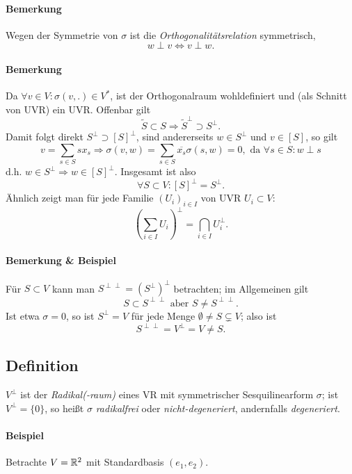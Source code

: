 \paragraph{Bemerkung}
	Wegen der Symmetrie von $ \sigma $ ist die \emph{Orthogonalitätsrelation} symmetrisch,
		\[ w \perp v \Leftrightarrow v \perp w. \]
\paragraph{Bemerkung}
	Da $ \forall v\in V: \sigma(v,.) \in V^* $, ist der Orthogonalraum wohldefiniert und (als Schnitt von UVR) ein UVR. Offenbar gilt
		\[ \tilde{S} \subset S \Rightarrow \tilde{S}^\perp \supset S^\perp. \]
	Damit folgt direkt $ S^\perp \supset [S]^\perp $, sind andererseits $ w\in S^\perp $ und $ v\in [S] $, so gilt
		\[ v = \sum_{s\in S}sx_s \Rightarrow \sigma(v,w)= \sum_{s\in S}\overline{x_s}\sigma(s,w) = 0, \text{ da } \forall s\in S: w\perp s \]
	d.h. $ w\in S^\perp \Rightarrow w\in [S]^\perp. $ Insgesamt ist also
		\[ \forall S \subset V: [S]^\perp=S^\perp.\]
	Ähnlich zeigt man für jede Familie $ (U_i)_{i\in I} $ von UVR $ U_i\subset V $:
		\[ \left(\sum_{i\in I}U_i \right)^\perp= \bigcap_{i\in I} U_i^\perp. \]
\paragraph{Bemerkung \& Beispiel}
	Für $ S\subset V $ kann man $ S^{\perp\perp} = \left(S^\perp\right)^\perp $ betrachten; im Allgemeinen gilt
		\[ S\subset S^{\perp\perp} \text{ aber } S\neq S^{\perp\perp}. \]
	Ist etwa $ \sigma = 0 $, so ist $ S^\perp = V $ für jede Menge $ \emptyset \neq S\subsetneq V $; also ist
		\[ S^{\perp\perp} = V^\perp = V \neq S. \]

\subsection{Definition}
\begin{Definition}
$ V^\perp $ ist der \emph{Radikal(-raum)} eines VR mit symmetrischer Sesquilinearform $ \sigma $; ist $ V^\perp = \{0 \} $, so heißt $ \sigma $ \emph{radikalfrei} oder \emph{nicht-degeneriert}, andernfalls \emph{degeneriert}.
\end{Definition}
\paragraph{Beispiel}
	Betrachte $ V=\mathbb{R}^2 $ mit Standardbasis $ (e_1,e_2) $.
	
